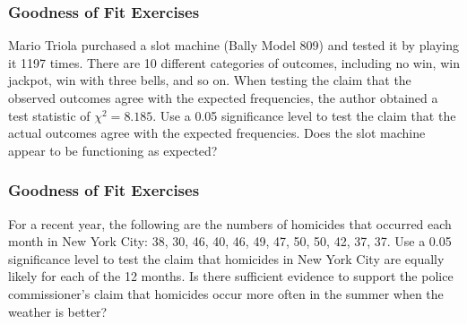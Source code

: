 \documentclass[xcolor=dvipsnames]{beamer}
\begin{document}

\begin{frame}
  \frametitle{Goodness of Fit Exercises}
  {\ubung} Mario Triola purchased a slot machine (Bally Model 809) and
  tested it by playing it 1197 times. There are 10 different
  categories of outcomes, including no win, win jackpot, win with
  three bells, and so on. When testing the claim that the observed
  outcomes agree with the expected frequencies, the author obtained a
  test statistic of $\chi^{2}=8.185$. Use a 0.05 significance level to
  test the claim that the actual outcomes agree with the expected
  frequencies. Does the slot machine appear to be functioning as
  expected?
\end{frame}

\begin{frame}
  \frametitle{Goodness of Fit Exercises}
  {\ubung} For a recent year, the following are the numbers of
  homicides that occurred each month in New York City: 38, 30, 46, 40,
  46, 49, 47, 50, 50, 42, 37, 37. Use a 0.05 significance level to
  test the claim that homicides in New York City are equally likely
  for each of the 12 months. Is there sufficient evidence to support
  the police commissioner's claim that homicides occur more often in
  the summer when the weather is better?
\end{frame}

\end{document}

